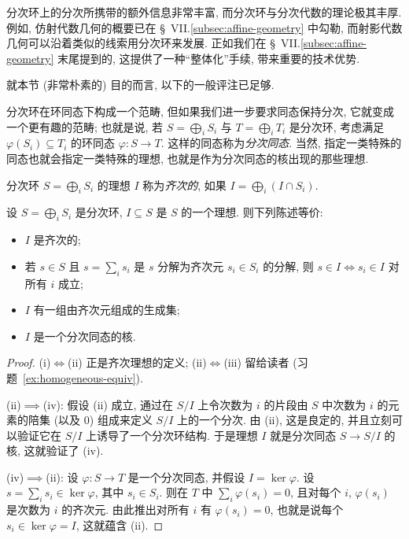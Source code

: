 分次环上的分次所携带的额外信息非常丰富, 而分次环与分次代数的理论极其丰厚. 例如, 仿射代数几何的概要已在 \S~VII.\ref{subsec:affine-geometry} 中勾勒, 而射影代数几何可以沿着类似的线索用分次环来发展. 正如我们在 \S~VII.\ref{subsec:affine-geometry} 末尾提到的, 这提供了一种``整体化''手续, 带来重要的技术优势.

就本节 (非常朴素的) 目的而言, 以下的一般评注已足够.

分次环在环同态下构成一个范畴, 但如果我们进一步要求同态保持分次, 它就变成一个更有趣的范畴; 也就是说, 若 $S=\bigoplus_i S_i$ 与 $T=\bigoplus_i T_i$ 是分次环, 考虑满足 $\varphi(S_i)\subseteq T_i$ 的环同态 $\varphi:S\to T$. 这样的同态称为\emph{分次同态}. 当然, 指定一类特殊的同态也就会指定一类特殊的理想, 也就是作为分次同态的核出现的那些理想.

\begin{definition}\label{def:homogeneous-ideal}
分次环 $S=\bigoplus_i S_i$ 的理想 $I$ 称为\emph{齐次的}, 如果 $I=\bigoplus_i(I\cap S_i)$.
\end{definition}

\begin{lemma}\label{lem:homogeneous-ideal}
设 $S=\bigoplus_i S_i$ 是分次环, $I\subseteq S$ 是 $S$ 的一个理想. 则下列陈述等价:
\begin{itemize}
\item[(i)] $I$ 是齐次的;
\item[(ii)] 若 $s\in S$ 且 $s=\sum_i s_i$ 是 $s$ 分解为齐次元 $s_i\in S_i$ 的分解, 则 $s\in I\iff s_i\in I$ 对所有 $i$ 成立;
\item[(iii)] $I$ 有一组由齐次元组成的生成集;
\item[(iv)] $I$ 是一个分次同态的核.
\end{itemize}
\end{lemma}

\begin{proof}
(i)$\iff$(ii) 正是齐次理想的定义; (ii)$\iff$(iii) 留给读者 (习题~\ref{ex:homogeneous-equiv}).

(ii)$\implies$(iv): 假设 (ii) 成立, 通过在 $S/I$ 上令次数为 $i$ 的片段由 $S$ 中次数为 $i$ 的元素的陪集 (以及 $0$) 组成来定义 $S/I$ 上的一个分次. 由 (ii), 这是良定的, 并且立刻可以验证它在 $S/I$ 上诱导了一个分次环结构. 于是理想 $I$ 就是分次同态 $S\to S/I$ 的核, 这就验证了 (iv).

(iv)$\implies$(ii): 设 $\varphi:S\to T$ 是一个分次同态, 并假设 $I=\ker\varphi$. 设 $s=\sum_i s_i\in\ker\varphi$, 其中 $s_i\in S_i$. 则在 $T$ 中 $\sum_i\varphi(s_i)=0$, 且对每个 $i$, $\varphi(s_i)$ 是次数为 $i$ 的齐次元. 由此推出对所有 $i$ 有 $\varphi(s_i)=0$, 也就是说每个 $s_i\in\ker\varphi=I$, 这就蕴含 (ii).
\end{proof}

